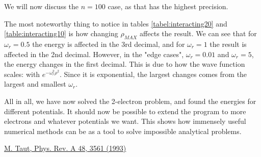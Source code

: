\documentclass[10pt,showpacs,preprintnumbers,footinbib,amsmath,amssymb,aps,prl,twocolumn,groupedaddress,superscriptaddress,showkeys]{revtex4-1}
\begin{document}
We will now discuss the $n = 100$ case, as that has the highest precision.

The most noteworthy thing to notice in tables \ref{tabel:interacting20} and \ref{table:interacting10}  is how changing $\rho_{MAX}$ affects the result. We can see that for $\omega_r = 0.5$ the energy is affected in the 3rd decimal, and for $\omega_r = 1$ the result is affected in the 2nd decimal. However, in the "edge cases", $\omega_r = 0.01$ and $\omega_r = 5$, the energy changes in the first decimal. This is due to how the wave function scales: with $e^{-\omega_r^2\rho^2}$. Since it is exponential, the largest changes comes from the largest and smallest $\omega_r$. 

All in all, we have now solved the 2-electron problem, and found the energies for different potentials. It should now be possible to extend the program to more electrons and whatever potentials we want. This shows how immensely useful numerical methods can be as a tool to solve impossible analytical problems.


\begin{thebibliography}{99}
\href{http://prola.aps.org/abstract/PRA/v48/i5/p3561_1}{M. Taut, Phys. Rev. A 48, 3561 (1993)}
\end{thebibliography}
\end{document}
